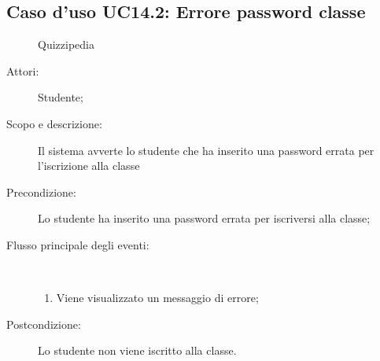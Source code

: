 \subsection{Caso d'uso UC14.2: Errore password classe}
	\begin{figure}[H]
		\centering
		\begin{resizedtikzpicture}{\textwidth}
		\begin{umlsystem}[x=0, fill=lightgray!20]{Quizzipedia}
		\end{umlsystem}
		\end{resizedtikzpicture}
		\caption{}
	\end{figure}
\begin{description}
\item[Attori:] Studente;
\item[Scopo e descrizione:] Il sistema avverte lo studente che ha inserito una password errata per l'iscrizione alla classe
      \item[Precondizione:] Lo studente ha inserito una password errata per iscriversi alla classe;

        \item[Flusso principale degli eventi:] \ 
 \begin{enumerate}
          \item Viene visualizzato un messaggio di errore;

      \end{enumerate}
    \item[Postcondizione:] Lo studente non viene iscritto alla classe.
  \end{description}
\hypertarget{UC15}{}

